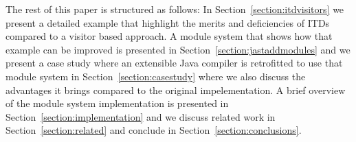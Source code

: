 The rest of this paper is structured as follows: In
Section~\ref{section:itdvisitors} we present a detailed example that
highlight the merits and deficiencies of ITDs compared to a visitor based
approach. A module system that shows how that example can be improved is
presented in Section~\ref{section:jastaddmodules} and we present a case
study where an extensible Java compiler is retrofitted to use that module
system in Section~\ref{section:casestudy} where we also discuss 
the advantages it brings compared to the original impelementation. A
brief overview of the module system implementation is presented in
Section~\ref{section:implementation} and we discuss related work in
Section~\ref{section:related} and conclude in
Section~\ref{section:conclusions}.

